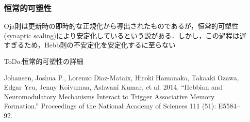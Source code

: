 \subsubsection{恒常的可塑性}
Oja則は更新時の即時的な正規化から導出されたものであるが，恒常的可塑性 (synaptic scaling)により安定化しているという説がある\cite{Turrigiano2008-lm}\cite{Yee2017-fb}．しかし，この過程は遅すぎるため，Hebb則の不安定化を安定化するに至らない\cite{Zenke2017-el}

ToDo:恒常的可塑性の詳細

Johansen, Joshua P., Lorenzo Diaz-Mataix, Hiroki Hamanaka, Takaaki Ozawa, Edgar Ycu, Jenny Koivumaa, Ashwani Kumar, et al. 2014. “Hebbian and Neuromodulatory Mechanisms Interact to Trigger Associative Memory Formation.” Proceedings of the National Academy of Sciences 111 (51): E5584–92.
